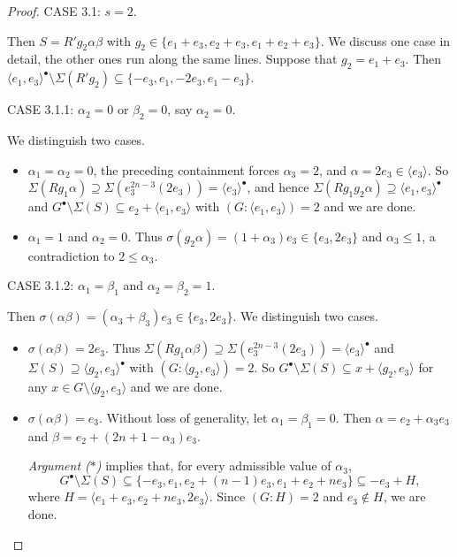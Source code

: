 \documentclass[a4paper, 10pt]{amsart}
\theoremstyle{plain}
\theoremstyle{definition}
\numberwithin{equation}{section}
\begin{document}
{\begin{proof}
	
	\smallskip
	\noindent
	CASE 3.1:  $s=2$. 

Then $S=R'g_2\alpha \beta$ with $g_2 \in \{ e_1+e_3, e_2+e_3, e_1+e_2+e_3\}$. We  discuss one case in detail, the other ones run along the same lines. Suppose that $g_2=e_1+e_3$.   Then $\langle e_1,e_3\rangle^{\bullet} \setminus \Sigma (R'g_2)\subseteq \{-e_3,e_1,-2e_3,e_1-e_3\}$. %
	
\smallskip
\noindent
CASE 3.1.1: $\alpha_2=0$ or $ \beta_2=0$, say $\alpha_2=0$.

We distinguish two cases.
\begin{itemize}
\item[(i)] $\alpha_1=\alpha_2= 0$, the preceding containment forces $\alpha_3=2$, and $\alpha=2e_3 \in \langle e_3\rangle $. So $\Sigma(Rg_1\alpha)\supseteq \Sigma(e_3^{2n-3}(2e_3))= \langle e_3\rangle^{\bullet}$, and hence $\Sigma(Rg_1g_2\alpha)\supseteq \langle e_1,e_3\rangle^{\bullet}$ and $G^{\bullet} \setminus \Sigma (S) \subseteq e_2 + \langle e_1,e_3\rangle$  with $ (G:\langle e_1,e_3\rangle)=2$ and we are done.
		
\item[(ii)] $\alpha_1=1 $ and $ \alpha_2=0$. Thus $\sigma(g_2\alpha)=(1+\alpha_3)e_3\in \{e_3,2e_3\}$ and $\alpha_3\le 1$, a contradiction to $2\le \alpha_3$.
\end{itemize}
	
	
	
	
	\smallskip
	\noindent
	CASE 3.1.2: $\alpha_1= \beta_1$ and $ \alpha_2= \beta_2=1$. 

Then $\sigma(\alpha \beta)=(\alpha_3+\beta_3)e_3\in \{e_3,2e_3\}$. We distinguish two cases.
\begin{itemize}
\item[(i)] $\sigma(\alpha \beta)=2e_3$. Thus $\Sigma(Rg_1\alpha \beta)\supseteq \Sigma(e_3^{2n-3}(2e_3))= \langle e_3\rangle^{\bullet}$ and $\Sigma (S) \supseteq  \langle g_2,e_3\rangle^{\bullet}$  with $ (G:\langle g_2,e_3\rangle)=2$. So $G^{\bullet} \setminus \Sigma (S) \subseteq x + \langle g_2,e_3\rangle$ for any $x\in G\setminus \langle g_2,e_3\rangle$ and we are done. 
		
\item[(ii)] $\sigma(\alpha \beta)=e_3$.  Without loss of generality, let $\alpha_1= \beta_1=0$. Then $\alpha=e_2+\alpha_3 e_3$ and $\beta =e_2+(2n+1-\alpha_3)e_3$. 

{\it Argument ($*$)} implies that, for every admissible value of $\alpha_3$,
\[
G^{\bullet}\setminus\Sigma(S)\subseteq\{-e_3,e_1,e_2+(n-1)e_3,e_1+e_2+ne_3\}
\subseteq-e_3+H,
\]
where $H=\langle e_1+e_3,e_2+ne_3,2e_3\rangle$. Since $(G:H)=2$ and $e_3\notin H$, we are done.
\end{itemize}
	

\end{proof}}
\end{document}
